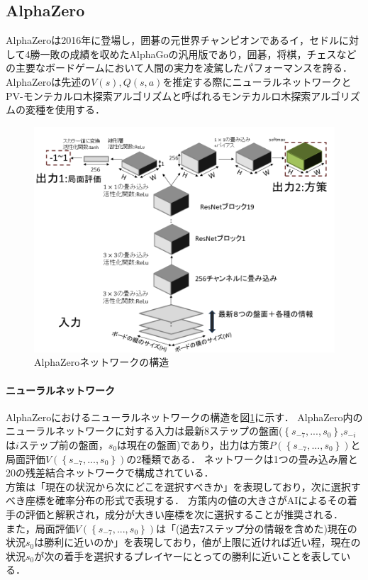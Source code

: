 \subsection{AlphaZero}
AlphaZeroは2016年に登場し，囲碁の元世界チャンピオンであるイ，セドルに対して4勝一敗の成績を収めたAlphaGoの汎用版であり，囲碁，将棋，チェスなどの主要なボードゲームにおいて人間の実力を凌駕したパフォーマンスを誇る．
AlphaZeroは先述の$V(s),Q(s, a)$を推定する際にニューラルネットワークとPV-モンテカルロ木探索アルゴリズムと呼ばれるモンテカルロ木探索アルゴリズムの変種を使用する．
\begin{figure}[t]
	\centering
	\includegraphics[width=\linewidth]{./figure/network.png}
	\caption{AlphaZeroネットワークの構造}
	\label{fig:network}
\end{figure}
\paragraph{ニューラルネットワーク}
AlphaZeroにおけるニューラルネットワークの構造を図\ref{fig:network}に示す．
AlphaZero内のニューラルネットワークに対する入力は最新$8$ステップの盤面($\left\{ s_{-7}, ..., s_0 \right\}$,$s_{-i}$は$i$ステップ前の盤面，$s_{0}$は現在の盤面)であり，出力は方策$P(\left\{ s_{-7}, ..., s_0 \right\})$と
局面評価$V(\left\{ s_{-7}, ..., s_0 \right\})$の2種類である．
ネットワークは1つの畳み込み層と20の残差結合ネットワークで構成されている．  \\
方策は「現在の状況から次にどこを選択すべきか」を表現しており，次に選択すべき座標を確率分布の形式で表現する．
方策内の値の大きさがAIによるその着手の評価と解釈され，成分が大きい座標を次に選択することが推奨される．\\
また，局面評価$V(\left\{ s_{-7}, ..., s_0 \right\})$は「(過去7ステップ分の情報を含めた)現在の状況$s_0$は勝利に近いのか」を表現しており，値が上限に近ければ近い程，現在の状況$s_0$が次の着手を選択するプレイヤーにとっての勝利に近いことを表している．

